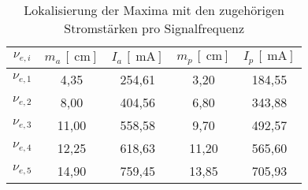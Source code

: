 \begin{table}[H]
  \centering
\begin{tabular}{c|cccc}
  \toprule
$\nu_{e, i}$ & $m_a \, [\SI{}{\centi\meter}]$ &
$I_a \, [\SI{}{\milli\ampere}]$ & $m_p \, [\SI{}{\centi\meter}]$ &
$I_p \, [\SI{}{\milli\ampere}]$ \\
 \midrule
  $\nu_{e, 1}$ & 4,35  & 254,61 & 3,20   &  184,55  \\
  $\nu_{e, 2}$ & 8,00  & 404,56 & 6,80   &  343,88  \\
  $\nu_{e, 3}$ & 11,00 & 558,58 & 9,70   &  492,57  \\
  $\nu_{e, 4}$ & 12,25 & 618,63 & 11,20  &  565,60  \\
  $\nu_{e, 5}$ & 14,90 & 759,45 & 13,85  &  705,93  \\
\bottomrule
\end{tabular}
\caption{Lokalisierung der Maxima mit den zugehörigen Stromstärken pro
Signalfrequenz}
\label{tab:maxima}
\end{table}
